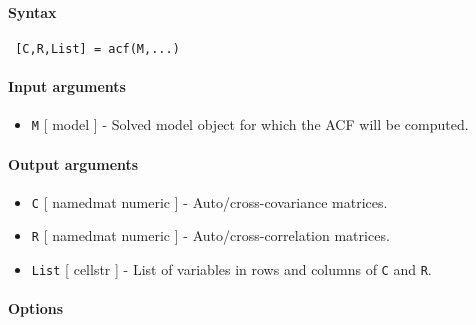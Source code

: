 


	\paragraph{Syntax}
 
 \begin{verbatim}
 [C,R,List] = acf(M,...)
 \end{verbatim}
 
 \paragraph{Input arguments}
 
 \begin{itemize}
 \item
   \texttt{M} {[} model {]} - Solved model object for which the ACF will
   be computed.
 \end{itemize}
 
 \paragraph{Output arguments}
 
 \begin{itemize}
 \item
   \texttt{C} {[} namedmat \textbar{} numeric {]} - Auto/cross-covariance
   matrices.
 \item
   \texttt{R} {[} namedmat \textbar{} numeric {]} -
   Auto/cross-correlation matrices.
 \item
   \texttt{List} {[} cellstr {]} - List of variables in rows and columns
   of \texttt{C} and \texttt{R}.
 \end{itemize}
 
 \paragraph{Options}
 
